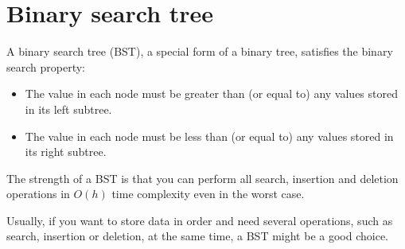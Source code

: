 
\chapter{Binary search tree}

A binary search tree (BST), a special form of a binary tree, satisfies the binary search property:

\begin{itemize}
\item The value in each node must be greater than (or equal to) any values stored in its left subtree.
\item The value in each node must be less than (or equal to) any values stored in its right subtree.
\end{itemize}




The strength of a BST is that you can perform all search, insertion and deletion operations in $O(h)$ time complexity even in the worst case.



Usually, if you want to store data in order and need several operations, such as search, insertion or deletion, at the same time, a BST might be a good choice.